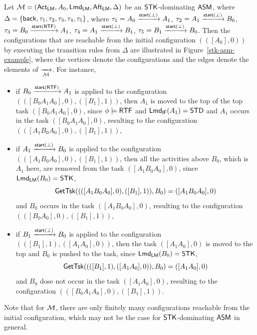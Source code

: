\begin{example}
Let ${\mathcal{M} }=({\sf Act}_{\textsf{LM}},A_0,{\sf Lmd}_{\textsf{LM}},{\sf Aft}_{\textsf{LM}},\Delta)$ be an $\mathsf{STK}$-dominating $\textsf{ASM}$, where $\Delta = \{{\mathsf{back} },\tau_1, \tau_2, \tau_3, \tau_4, \tau_5\}$, where 
		$\tau_1 = A_0 \xrightarrow{{\mathsf{start} }(\bot)} A_1$,
		$\tau_2 = A_1 \xrightarrow{{\mathsf{start} }(\bot)} B_0$,
		$\tau_3 = B_0 \xrightarrow{{\mathsf{start} }({\sf RTF})} A_1$,
		$\tau_4 = A_1 \xrightarrow{{\mathsf{start} }(\bot)} B_1$,
		$\tau_5 = B_1 \xrightarrow{{\mathsf{start} }(\bot)} B_0$.
	Then the configurations that are reachable from the initial configuration $(([A_0], 0))$ by executing the transition rules from $\Delta$ are illustrated in Figure~\ref{stk-asm-example}, where the vertices denote the configurations and the edges denote the elements of $\xrightarrow[{\mathcal{M} }]{}$. 
	For instance, 
	\begin{itemize}
	\item if $B_0 \xrightarrow{{\mathsf{start} }({\sf RTF})} A_1$ is applied to the configuration $(([B_0A_1A_0],0),([B_1],1))$, then $A_1$ is moved to the top of the top task $([B_0A_1A_0],0)$, since $\phi\models{\sf RTF}$ and ${\sf Lmd}_{\textsf{IF}}(A_1) = \mathsf{STD}$ and $A_1$ occurs in the task $([B_0A_1A_0],0)$, resulting to the configuration $(([A_1B_0A_0],0),([B_1],1))$,
	\item if $A_1 \xrightarrow{{\mathsf{start} }(\bot)} B_0$ is applied to the configuration $(([A_1B_0A_0],0),([B_1],1))$, then all the activities above $B_0$, which is $A_1$ here, are removed from the task $([A_1B_0A_0],0)$, since ${\sf Lmd}_{\textsf{LM}}(B_0) = \mathsf{STK}$, 
	$$\mathsf{GetTsk}((([A_1B_0A_0],0),([B_1],1)), B_0) = ([A_1B_0A_0],0)$$
	and $B_0$ occurs in the task $([A_1B_0A_0],0)$, resulting to the configuration $(([B_0A_0],0),([B_1],1))$,
	\item if $B_1 \xrightarrow{{\mathsf{start} }(\bot)} B_0$ is applied to the configuration $(([B_1],1),([A_1A_0], 0))$, then the task $([A_1A_0], 0)$ is moved to the top and $B_0$ is pushed to the task,
	since ${\sf Lmd}_{\textsf{LM}}(B_0) = \mathsf{STK}$, 
	$$\mathsf{GetTsk}((([B_1],1),([A_1A_0], 0)), B_0) = ([A_1A_0], 0)$$
	and $B_0$ dose not occur in the task $([A_1A_0], 0)$, resulting to the configuration $(([B_0A_1A_0],0),([B_1],1))$.
	\end{itemize}
	Note that for ${\mathcal{M} }$, there are only finitely many configurations reachable from the initial configuration, which may not be the case for $\mathsf{STK}$-dominating $\textsf{ASM}$ in general.  
	\begin{figure}
			\centering

\end{figure}
\end{example}

